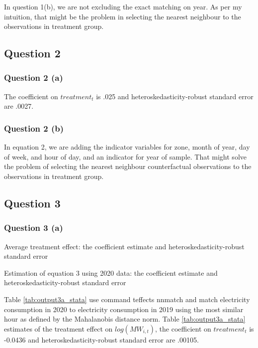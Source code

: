 \documentclass{article}
\begin{document}
In question 1(b), we are not excluding the exact matching on year. As per my intuition, that might be the problem in selecting the nearest neighbour to the observations in treatment group.

\subsection{Question 2 }
\subsubsection{Question 2 (a) }
The coefficient on $treatment_t$ is .025 and heteroskedasticity-robust standard error are .0027.

\subsubsection{Question 2 (b) }
In equation 2, we are adding the indicator variables for zone, month of year, day of week, and hour of day, and an indicator for year of sample. That might solve the problem of selecting the nearest neighbour counterfactual observations to the observations in treatment group.

\subsection{Question 3 }
\subsubsection{Question 3 (a) }
\begin{table}[ht]
    \centering
    
    \caption{Average treatment effect: the coefficient estimate and heteroskedasticity-robust standard error}
    \label{tab:output3a_stata}
\end{table}

\begin{table}[ht]
    \centering
    
    \caption{Estimation of equation 3 using 2020 data: the coefficient estimate and heteroskedasticity-robust standard error}
    \label{tab:output3a2_stata}
\end{table}

Table \ref{tab:output3a_stata} use command teffects nnmatch and match electricity consumption in 2020 to electricity consumption in 2019 using the most similar hour as defined by the Mahalanobis distance norm. Table \ref{tab:output3a_stata} estimates of the treatment effect on $log(MW_{i,t})$, the coefficient on $treatment_t$ is -0.0436 and heteroskedasticity-robust standard error are .00105.
\end{document}
